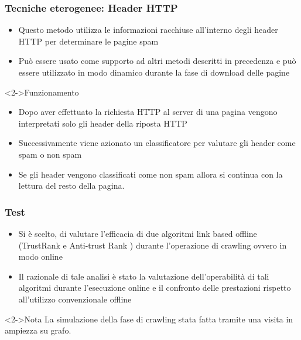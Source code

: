 \documentclass{beamer}
\begin{document}
\begin{frame}
  \frametitle{Tecniche eterogenee: Header HTTP}
\begin{itemize}
 \item Questo metodo utilizza le informazioni racchiuse all’interno degli header HTTP per determinare le pagine spam
 \item Può essere usato come supporto ad altri metodi descritti in precedenza e può essere utilizzato in modo dinamico durante la fase di download delle pagine
\end{itemize}
\begin{block}<2->{Funzionamento}
 \begin{itemize}
  \item Dopo aver effettuato la richiesta HTTP al server di una pagina vengono interpretati solo gli header della riposta HTTP
  \item Successivamente viene azionato un classificatore per valutare gli header come spam o non spam
  \item Se gli header vengono classificati come non spam allora si continua con la lettura del resto della pagina.
 \end{itemize}
\end{block}
\end{frame}
\begin{frame}
  \frametitle{Test}
  \begin{itemize}
   \item Si è scelto, di valutare l’efficacia di due algoritmi link based offline (TrustRank e Anti-trust Rank ) durante l’operazione di crawling ovvero in modo online
   \item Il razionale di tale analisi è stato la valutazione dell’operabilità di tali algoritmi durante l’esecuzione online e
il confronto delle prestazioni rispetto all’utilizzo convenzionale offline
  \end{itemize}
  \begin{block}<2->{Nota}
   La simulazione della fase di crawling  stata fatta tramite una visita in ampiezza su grafo.
  \end{block}
\end{frame}
\end{document}
